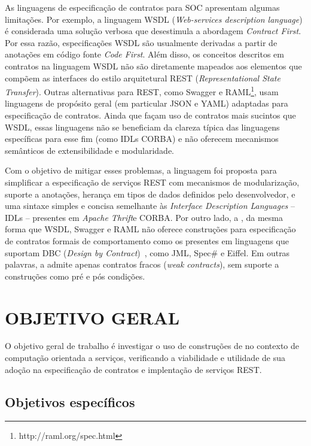 As linguagens de especificação de contratos para SOC apresentam
algumas limitações. Por exemplo, a linguagem WSDL (\emph{Web-services
description language}) \cite{zur2005developing} é considerada uma solução
verbosa que desestimula a abordagem \textit{Contract First}. Por essa razão,
especificações WSDL são usualmente derivadas a partir de anotações em código
fonte \textit{Code First}.
Além disso, os conceitos descritos em contratos na linguagem WSDL não são
diretamente mapeados aos elementos que compõem as interfaces do estilo
arquitetural REST (\emph{Representational State Transfer}).
Outras alternativas para REST, como Swagger e
RAML\footnote{http://raml.org/spec.html}, usam linguagens de propósito geral (em
particular JSON e YAML) adaptadas para especificação de contratos. Ainda que
façam uso de contratos mais sucintos que WSDL, essas linguagens não se
beneficiam da clareza típica das linguagens específicas para esse fim (como IDLs CORBA) e não oferecem
mecanismos semânticos de extensibilidade e modularidade.

Com o objetivo de mitigar esses problemas, a linguagem \neoidl foi proposta
para simplificar a especificação de serviços REST com mecanismos de modularização,
suporte a anotações, herança em tipos de dados definidos pelo desenvolvedor, e
uma sintaxe simples e concisa semelhante às \textit{Interface Description
Languages} -- IDLs -- presentes em \textit{Apache Thrift}\texttrademark e
CORBA\texttrademark. Por outro lado, a \neoidl, da mesma forma que WSDL, Swagger
e RAML não oferece construções para especificação de contratos formais de
comportamento como os presentes em linguagens que suportam DBC (\emph{Design by
Contract})~\cite{meyer1992applying}, como JML, Spec\# e Eiffel. Em outras
palavras, a \neoidl  admite apenas contratos fracos (\textit{weak contracts}),
sem suporte a construções como pré e pós condições.



\section{OBJETIVO GERAL}
\vspace{-6mm}

O objetivo geral de trabalho é investigar o uso de construções de
\designbycontract{} no contexto de computação orientada a serviços, verificando a
viabilidade e utilidade de sua adoção na especificação de contratos e
implentação de serviços REST.

\subsection{Objetivos específicos}
\vspace{-6mm}

